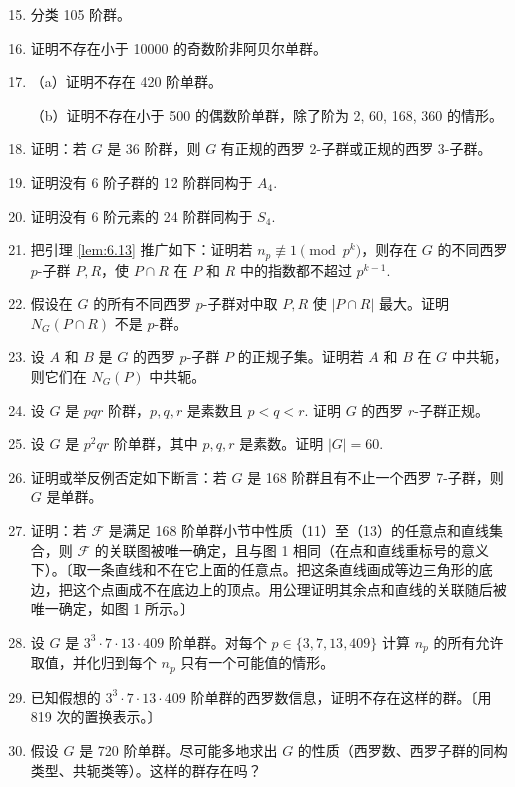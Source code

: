 \begin{enumerate}\setcounter{enumi}{14}
\item 分类 105 阶群。

\item 证明不存在小于 10000 的奇数阶非阿贝尔单群。

\item （a）证明不存在 420 阶单群。

（b）证明不存在小于 500 的偶数阶单群，除了阶为 2, 60, 168, 360 的情形。

\item 证明：若 \(G\) 是 36 阶群，则 \(G\) 有正规的西罗 2-子群或正规的西罗 3-子群。

\item 证明没有 6 阶子群的 12 阶群同构于 \(A_4\).

\item 证明没有 6 阶元素的 24 阶群同构于 \(S_4\).

\item 把引理 \ref{lem:6.13} 推广如下：证明若 \(n_p \not\equiv 1 \pmod{p^k}\)，则存在 \(G\) 的不同西罗 \(p\)-子群 \(P, R\)，使 \(P \cap R\) 在 \(P\) 和 \(R\) 中的指数都不超过 \(p^{k-1}\).

\item 假设在 \(G\) 的所有不同西罗 \(p\)-子群对中取 \(P, R\) 使 \(|P \cap R|\) 最大。证明 \(N_G(P \cap R)\) 不是 \(p\)-群。

\item 设 \(A\) 和 \(B\) 是 \(G\) 的西罗 \(p\)-子群 \(P\) 的正规子集。证明若 \(A\) 和 \(B\) 在 \(G\) 中共轭，则它们在 \(N_G(P)\) 中共轭。

\item 设 \(G\) 是 \(pqr\) 阶群，\(p, q, r\) 是素数且 \(p < q < r\). 证明 \(G\) 的西罗 \(r\)-子群正规。

\item 设 \(G\) 是 \(p^2qr\) 阶单群，其中 \(p, q, r\) 是素数。证明 \(|G| = 60\).

\item 证明或举反例否定如下断言：若 \(G\) 是 168 阶群且有不止一个西罗 7-子群，则 \(G\) 是单群。

\item 证明：若 \(\mathcal{F}\) 是满足 168 阶单群小节中性质（11）至（13）的任意点和直线集合，则 \(\mathcal{F}\) 的关联图被唯一确定，且与图 1 相同（在点和直线重标号的意义下）。〔取一条直线和不在它上面的任意点。把这条直线画成等边三角形的底边，把这个点画成不在底边上的顶点。用公理证明其余点和直线的关联随后被唯一确定，如图 1 所示。〕

\item 设 \(G\) 是 \(3^3 \cdot 7 \cdot 13 \cdot 409\) 阶单群。对每个 \(p \in \{3, 7, 13, 409\}\) 计算 \(n_p\) 的所有允许取值，并化归到每个 \(n_p\) 只有一个可能值的情形。

\item 已知假想的 \(3^3 \cdot 7 \cdot 13 \cdot 409\) 阶单群的西罗数信息，证明不存在这样的群。〔用 819 次的置换表示。〕

\item 假设 \(G\) 是 720 阶单群。尽可能多地求出 \(G\) 的性质（西罗数、西罗子群的同构类型、共轭类等）。这样的群存在吗？
\end{enumerate}

